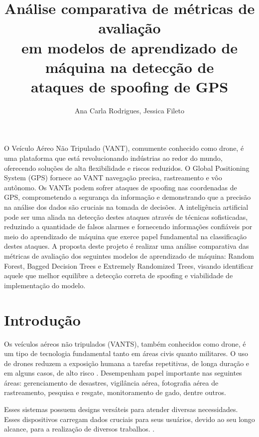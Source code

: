 \documentclass[12pt]{article}
\title{Análise comparativa de métricas de avaliação\\
em modelos de aprendizado de máquina na detecção de\\
ataques de spoofing de GPS
}
\author{Ana Carla Rodrigues\inst{1}, Jessica Fileto\inst{1}}
\begin{document}
\maketitle
     
\begin{resumo} 
O Veículo Aéreo Não Tripulado (VANT), comumente conhecido como drone, é uma
plataforma que está revolucionando indústrias ao redor do mundo, oferecendo 
soluções de alta flexibilidade e riscos reduzidos. O Global Positioning System 
(GPS) fornece ao VANT navegação precisa, rastreamento e vôo autônomo. Os VANTs 
podem sofrer ataques de spoofing nas coordenadas de GPS, comprometendo a 
segurança da informação e demonstrando que a precisão na análise dos dados são 
cruciais na tomada de decisões. A inteligência artificial pode ser uma aliada 
na detecção destes ataques através de técnicas sofisticadas, reduzindo a 
quantidade de falsos alarmes e fornecendo informações confiáveis por meio do 
aprendizado de máquina que exerce papel fundamental na classificação destes 
ataques. A proposta deste projeto é realizar uma análise comparativa das 
métricas de avaliação dos seguintes modelos de aprendizado de máquina: Random 
Forest, Bagged Decision Trees e Extremely Randomized Trees, visando identificar 
aquele que melhor equilibre a detecção correta de spoofing e viabilidade de 
implementação do modelo.
\end{resumo}

\section{Introdução}

Os veículos aéreos não tripulados (VANTS), também conhecidos como drone,
é um tipo de tecnologia fundamental tanto em áreas civis quanto militares.
O uso de drones reduzem a exposição humana a tarefas repetitivas, de longa duração e em alguns casos, de alto risco \cite{dialogos}.
Desempenham papel importante nas seguintes áreas: gerenciamento de desastres, vigilância aérea, fotografia aérea de rastreamento, pesquisa e resgate,
monitoramento de gado, dentre outros. \cite{titounaLightweightSecurityTechnique2021} 

Esses sistemas possuem designs versáteis para atender diversas necessidades.
Esses dispositivos carregam dados cruciais para seus usuários, devido ao seu longo alcance,
para a realização de diversos trabalhos. \cite{khan}. 
\end{document}
